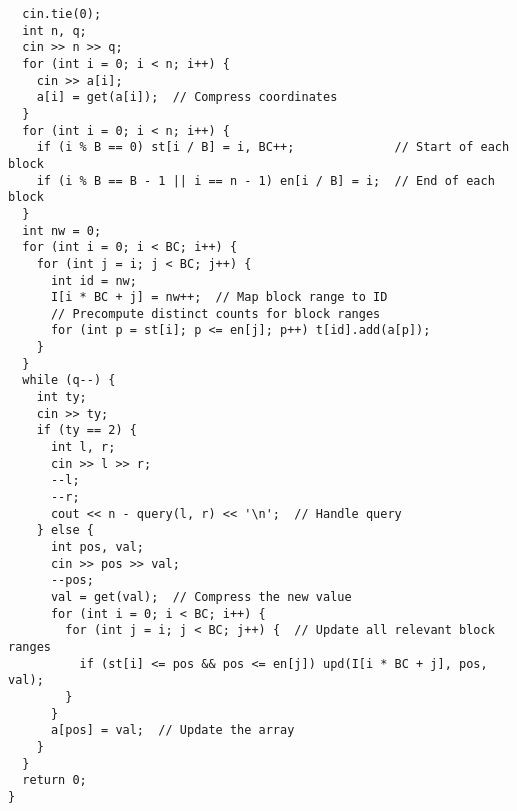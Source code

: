 \documentclass[twoside]{article}
\begin{document}
\begin{multicols*}{2}
\begin{verbatim}
  cin.tie(0);
  int n, q;
  cin >> n >> q;
  for (int i = 0; i < n; i++) {
    cin >> a[i];
    a[i] = get(a[i]);  // Compress coordinates
  }
  for (int i = 0; i < n; i++) {
    if (i % B == 0) st[i / B] = i, BC++;              // Start of each block
    if (i % B == B - 1 || i == n - 1) en[i / B] = i;  // End of each block
  }
  int nw = 0;
  for (int i = 0; i < BC; i++) {
    for (int j = i; j < BC; j++) {
      int id = nw;
      I[i * BC + j] = nw++;  // Map block range to ID
      // Precompute distinct counts for block ranges
      for (int p = st[i]; p <= en[j]; p++) t[id].add(a[p]);
    }
  }
  while (q--) {
    int ty;
    cin >> ty;
    if (ty == 2) {
      int l, r;
      cin >> l >> r;
      --l;
      --r;
      cout << n - query(l, r) << '\n';  // Handle query
    } else {
      int pos, val;
      cin >> pos >> val;
      --pos;
      val = get(val);  // Compress the new value
      for (int i = 0; i < BC; i++) {
        for (int j = i; j < BC; j++) {  // Update all relevant block ranges
          if (st[i] <= pos && pos <= en[j]) upd(I[i * BC + j], pos, val);
        }
      }
      a[pos] = val;  // Update the array
    }
  }
  return 0;
}
\end{verbatim}

{
}
\end{multicols*}
\end{document}
